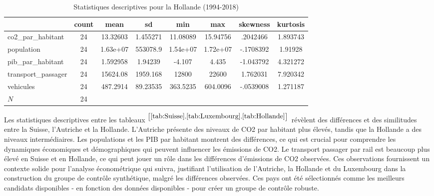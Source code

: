 

\begin{table}[H]
    \centering
    \def\sym#1{\ifmmode^{#1}\else\(^{#1}\)\fi}
\footnotesize{
    \begin{tabular}{|l*{1}{|ccccccc|}}
        \hline
        & count & mean & sd & min & max & skewness & kurtosis \\
        \hline
        co2\_par\_habitant & 24 & 13.32603 & 1.455271 & 11.08089 & 15.94756 & .2042466 & 1.893743 \\
        population & 24 & 1.63e+07 & 553078.9 & 1.54e+07 & 1.72e+07 & -.1708392 & 1.91928 \\
        pib\_par\_habitant & 24 & 1.592958 & 1.94239 & -4.107 & 4.435 & -1.043792 & 4.321272 \\
        transport\_passager & 24 & 15624.08 & 1959.168 & 12800 & 22600 & 1.762031 & 7.920342 \\
        vehicules & 24 & 487.2914 & 89.23535 & 363.5235 & 604.0096 & -.0539008 & 1.271187 \\
        \hline
        \(N\) & 24 & & & & & & \\
        \hline
    \end{tabular}
}
    \caption{Statistiques descriptives pour la Hollande (1994-2018)}
    \label{tab:Hollande}
\end{table}

\normalsize

Les statistiques descriptives entre les tableaux $^{ \left[\ref{tab:Suisse}, \ref{tab:Luxembourg}, \ref{tab:Hollande} \right]}$ révèlent des différences et des similitudes entre la Suisse, l'Autriche et la Hollande. L'Autriche présente des niveaux de CO2 par habitant plus élevés, tandis que la Hollande a des niveaux intermédiaires. Les populations et les PIB par habitant montrent des différences, ce qui est crucial pour comprendre les dynamiques économiques et démographiques qui peuvent influencer les émissions de CO2. Le transport passager par rail est beaucoup plus élevé en Suisse et en Hollande, ce qui peut jouer un rôle dans les différences d'émissions de CO2 observées. Ces observations fournissent un contexte solide pour l'analyse économétrique qui suivra, justifiant l'utilisation de l'Autriche, la Hollande et du Luxembourg dans la construction du groupe de contrôle synthétique, malgré les différences observées. Ces pays ont été sélectionnés comme les meilleurs candidats disponibles - en fonction des données disponibles - pour créer un groupe de contrôle robuste.










